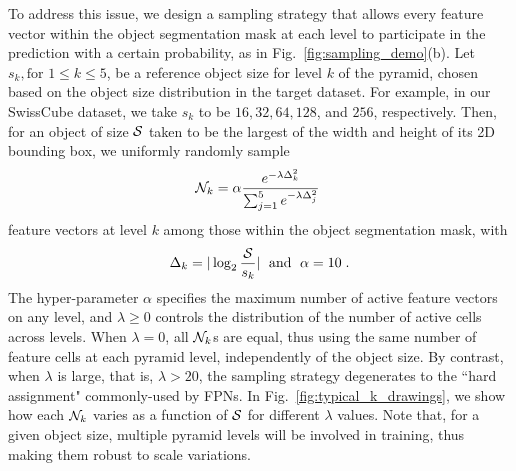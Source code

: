 To address this issue, we design a sampling strategy that allows every feature vector within the object segmentation mask at each level to participate in the prediction with a certain probability, as in Fig.~\ref{fig:sampling_demo}(b). 
%
Let $s_{k}, \text{for } 1\leq k \leq 5$, be a reference object size for level $k$ of the pyramid, chosen based on the object size distribution in the target dataset. For example, in our SwissCube dataset,
we take $s_k$  to be $16, 32, 64, 128$, and $256$, respectively. Then, for an object of size ${\cal S}$ taken to be the largest of the width and height of its 2D bounding box, we uniformly randomly sample
\begin{equation}
    {\cal N}_k=\alpha \frac{e^{-\lambda \Delta_{k}^{2}}}{\sum^{5}_{j=1}{e^{-\lambda \Delta_{j}^{2}}}}\;
\label{eq:nk}
\end{equation}
feature vectors at level $k$ among those within the object segmentation mask, with 
%
\begin{equation}
    \Delta_k= | \log_{2}\frac{{\cal S}}{s_k} | \; \mbox{ and } \; \alpha=10 \; .
\label{eq:dk}
\end{equation}
The hyper-parameter $\alpha$ specifies the maximum number of active feature vectors on any level, and $\lambda \geq 0$ controls the distribution of the number of active cells across levels. When $\lambda = 0$, all ${\cal N}_k$s are equal, thus using the same number of feature cells at each pyramid level, independently of the object size. By contrast, when $\lambda$ is large, that is, $\lambda > 20$, the sampling strategy degenerates to the ``hard assignment" commonly-used by  FPNs. In Fig.~\ref{fig:typical_k_drawings}, we show how each ${\cal N}_k$ varies as a function of ${\cal S}$ for different $\lambda$ values.  Note that, for a given object size, multiple pyramid levels will be involved in training, thus making them  robust to scale variations.




